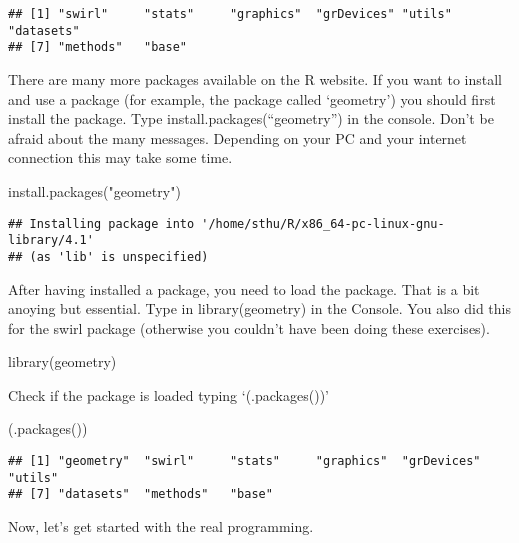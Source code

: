 \documentclass[
]{article}
\newenvironment{Shaded}{\begin{snugshade}}{\end{snugshade}}
\newcommand{\FunctionTok}[1]{\textcolor[rgb]{0.00,0.00,0.00}{#1}}
\newcommand{\NormalTok}[1]{#1}
\newcommand{\StringTok}[1]{\textcolor[rgb]{0.31,0.60,0.02}{#1}}
\begin{document}
\begin{verbatim}
## [1] "swirl"     "stats"     "graphics"  "grDevices" "utils"     "datasets" 
## [7] "methods"   "base"
\end{verbatim}

There are many more packages available on the R website. If you want to
install and use a package (for example, the package called `geometry')
you should first install the package. Type
install.packages(``geometry'') in the console. Don't be afraid about the
many messages. Depending on your PC and your internet connection this
may take some time.

\begin{Shaded}
\begin{Highlighting}[]
\FunctionTok{install.packages}\NormalTok{(}\StringTok{"geometry"}\NormalTok{)}
\end{Highlighting}
\end{Shaded}

\begin{verbatim}
## Installing package into '/home/sthu/R/x86_64-pc-linux-gnu-library/4.1'
## (as 'lib' is unspecified)
\end{verbatim}

After having installed a package, you need to load the package. That is
a bit anoying but essential. Type in library(geometry) in the Console.
You also did this for the swirl package (otherwise you couldn't have
been doing these exercises).

\begin{Shaded}
\begin{Highlighting}[]
\FunctionTok{library}\NormalTok{(geometry)}
\end{Highlighting}
\end{Shaded}

Check if the package is loaded typing `(.packages())'

\begin{Shaded}
\begin{Highlighting}[]
\NormalTok{(}\FunctionTok{.packages}\NormalTok{())}
\end{Highlighting}
\end{Shaded}

\begin{verbatim}
## [1] "geometry"  "swirl"     "stats"     "graphics"  "grDevices" "utils"    
## [7] "datasets"  "methods"   "base"
\end{verbatim}

Now, let's get started with the real programming.
\end{document}
